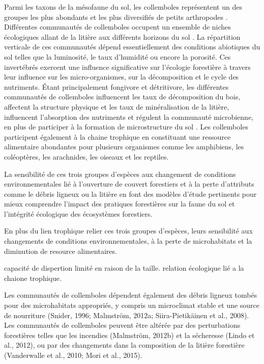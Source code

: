 Parmi les taxons de la mésofaune du sol, les collemboles représentent un des groupes les plus abondants et les plus diversifiés de petits arthropodes \citep{rusekBiodiversityCollembolaTheir1998}. 
Différentes communautés de collemboles occupent un ensemble de niches écologiques allant de la litière aux différents horizons du sol \citep{pongeVerticalDistributionCollembola2000}.
La répartition verticale de ces communautés dépend essentiellement des conditions abiotiques du sol telles que la luminosité, le taux d’humidité ou encore la porosité.
Ces invertébrés exercent une influence significative sur l'écologie forestière à travers leur influence sur les micro-organismes, sur la décomposition et le cycle des nutriments.
Étant principalement fongivore et détritivore, les différentes communautés de collemboles influencent les taux de décomposition du bois, affectent la structure physique et les taux de minéralisation de la litière, 
influencent l'absorption des nutriments et régulent la communauté microbienne, en plus de participer à la formation de microstructure du sol \citep{Petersen1982ComparativeAnalysisa,Neher2012Linkinginvertebrate,Maass2015Functionalrole,Potapov2016Connectingtaxonomy}. 
Les collemboles participent également à la chaine trophique en constituant une ressource alimentaire abondantes pour plusieurs organismes comme les amphibiens, les coléoptères, les arachnides, les oiseaux et les reptiles.

La sensibilité de ces trois groupes d'espèces aux changement de conditions environnementales lié à l'ouverture de couvert forestiers et à la perte d'attributs comme le débris ligneux ou la litière en font des modèles d'étude pertinents pour mieux comprendre l'impact des pratiques forestières sur la faune du sol et l'intégrité écologique des écosystèmes forestiers.

En plus du lien trophique relier ces trois groupes d'espèces, leurs sensibilité aux changements de conditions environnementales, à la perte de microhabitats et la diminution de resource alimentaires.

capacité de dispertion limité en raison de la taille.
relation écologique lié a la chaione trophique. 

Les communautés de collemboles dépendent également des débris ligneux tombés pour des microhabitats appropriés, y compris un microclimat stable et une source de nourriture (Snider, 1996; Malmström, 2012a; Siira-Pietikäinen et al., 2008). 
Les communautés de collemboles peuvent être altérée par des perturbations forestières telles que les incendies (Malmström, 2012b) et la sécheresse (Lindo et al., 2012), ou par des changements dans la composition de la litière forestière (Vanderwalle et al., 2010; Mori et al., 2015).

